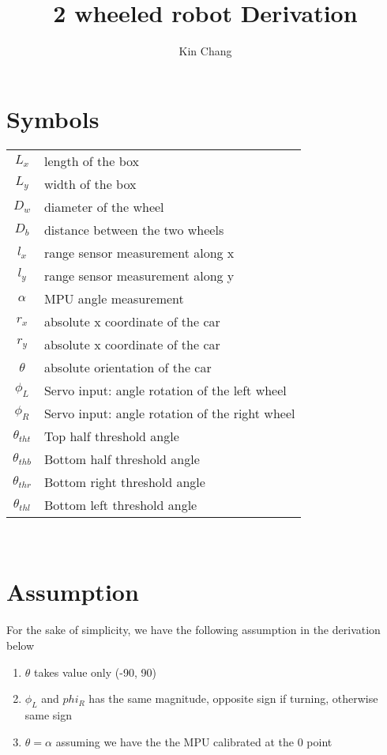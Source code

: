 \documentclass[12pt, letterpaper]{amsart} %
\author{Kin Chang}
\title{2 wheeled robot Derivation}
\numberwithin{equation}{section}
\begin{document}
\maketitle
\section{Symbols}
\begin{tabular}{cp{}}
  $L_x$ & length of the box  \\
  $L_y$ & width of the box \\
  $D_w$ & diameter of the wheel \\
  $D_b$ & distance between the two wheels \\
  $l_x$ & range sensor measurement along x \\
  $l_y$ & range sensor measurement along y \\
  $\alpha$ & MPU angle measurement \\
  $r_x$ & absolute x coordinate of the car \\
  $r_y$ & absolute x coordinate of the car \\
  $\theta$ & absolute orientation of the car \\
  $\phi_L$ & Servo input: angle rotation of the left wheel \\
  $\phi_R$ & Servo input: angle rotation of the right wheel \\
  $\theta_{tht}$ & Top half threshold angle \\
  $\theta_{thb}$ & Bottom half threshold angle \\
  $\theta_{thr}$ & Bottom right threshold angle \\
  $\theta_{thl}$ & Bottom left threshold angle \\  
\end{tabular}\\
\section{Assumption}
For the sake of simplicity, we have the following assumption in the derivation below
\begin{enumerate}
\item $\theta$ takes value only (-90, 90)
\item $\phi_L$ and $phi_R$ has the same magnitude, opposite sign if turning, otherwise same sign 
\item $\theta = \alpha$ assuming we have the the MPU calibrated at the 0 point
\end{enumerate}  
\end{document}
